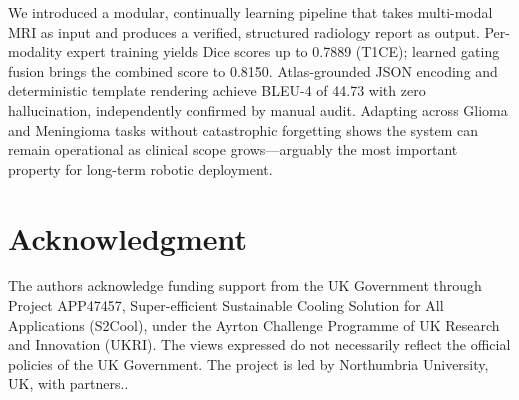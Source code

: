 \documentclass[conference]{IEEEtran}
\begin{document}
We introduced a modular, continually learning pipeline that takes multi-modal MRI as input and produces a verified, structured radiology report as output. Per-modality expert training yields Dice scores up to 0.7889 (T1CE); learned gating fusion brings the combined score to 0.8150. Atlas-grounded JSON encoding and deterministic template rendering achieve BLEU-4 of 44.73 with zero hallucination, independently confirmed by manual audit. Adapting across Glioma and Meningioma tasks without catastrophic forgetting shows the system can remain operational as clinical scope grows---arguably the most important property for long-term robotic deployment.

\section*{Acknowledgment}{
The authors acknowledge funding support from the UK Government through Project APP47457, Super-efficient Sustainable Cooling Solution for All Applications (S2Cool), under the Ayrton Challenge Programme of UK Research and Innovation (UKRI). The views expressed do not necessarily reflect the official policies of the UK Government. The project is led by Northumbria University, UK, with partners.}.



\end{document}
